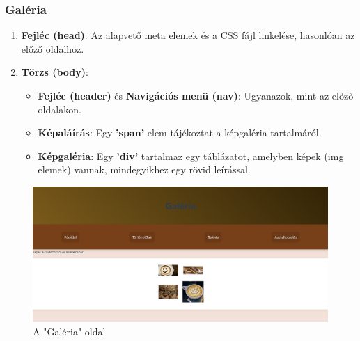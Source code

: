 \documentclass{article}
\begin{document}
\subsubsection{Galéria}
\begin{enumerate}
	\item \textbf{Fejléc (head)}: Az alapvető meta elemek és a CSS fájl linkelése, hasonlóan az előző oldalhoz.
	\item \textbf{Törzs (body)}:
		\begin{itemize}
			\item \textbf{Fejléc (header)} és \textbf{Navigációs menü (nav)}: Ugyanazok, mint az előző oldalakon.
			\item \textbf{Képaláírás}: Egy \textbf{'span'} elem tájékoztat a képgaléria tartalmáról.
			\item \textbf{Képgaléria}: Egy \textbf{'div'} tartalmaz egy táblázatot, amelyben képek (img elemek) vannak, mindegyikhez egy rövid leírással.
		\end{itemize}
\end{enumerate}
\begin{figure}[H]
	\centering
	\includegraphics[width=0.9\linewidth]{gallery.png}
	\caption{A "Galéria" oldal}
	\label{fig:gallery}
\end{figure}
\clearpage
\end{document}
